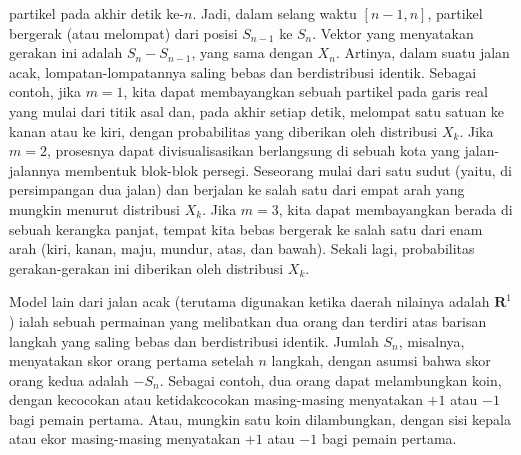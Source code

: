 partikel pada akhir detik ke-$n$.  Jadi, dalam selang waktu $[n-1, n]$, partikel
bergerak (atau melompat) dari posisi $S_{n-1}$ ke $S_{n}$.  Vektor yang menyatakan gerakan ini adalah
$S_n - S_{n-1}$, yang sama dengan $X_n$.  Artinya, dalam suatu jalan acak, lompatan-lompatannya
saling bebas dan berdistribusi identik.  Sebagai contoh, jika $m = 1$, kita dapat membayangkan sebuah 
partikel pada garis real yang mulai dari titik asal dan, pada akhir setiap detik, melompat satu
satuan ke kanan atau ke kiri, dengan probabilitas yang diberikan oleh distribusi $X_k$.  Jika
$m = 2$, prosesnya dapat divisualisasikan berlangsung di sebuah kota yang jalan-jalannya membentuk blok-blok
persegi.  Seseorang mulai dari satu sudut (yaitu, di persimpangan dua jalan) dan berjalan ke
salah satu dari empat arah yang mungkin menurut distribusi $X_k$.  Jika $m = 3$,
kita dapat membayangkan berada di sebuah kerangka panjat, tempat kita bebas bergerak ke salah satu dari enam arah
(kiri, kanan, maju, mundur, atas, dan bawah).  Sekali lagi, probabilitas gerakan-gerakan ini
diberikan oleh distribusi $X_k$.
\par
Model lain dari jalan acak (terutama digunakan ketika daerah nilainya adalah ${\mathbf R}^1$) ialah sebuah
permainan yang melibatkan dua orang dan terdiri atas barisan langkah yang saling bebas dan
berdistribusi identik.  Jumlah $S_n$, misalnya, menyatakan skor orang pertama
setelah $n$ langkah, dengan asumsi bahwa skor orang kedua adalah $-S_n$.  Sebagai
contoh, dua orang dapat melambungkan koin, dengan kecocokan atau ketidakcocokan
masing-masing menyatakan $+1$ atau $-1$
bagi pemain pertama.  Atau, mungkin satu koin dilambungkan, dengan sisi kepala atau ekor
masing-masing menyatakan $+1$ atau $-1$ bagi pemain pertama.
